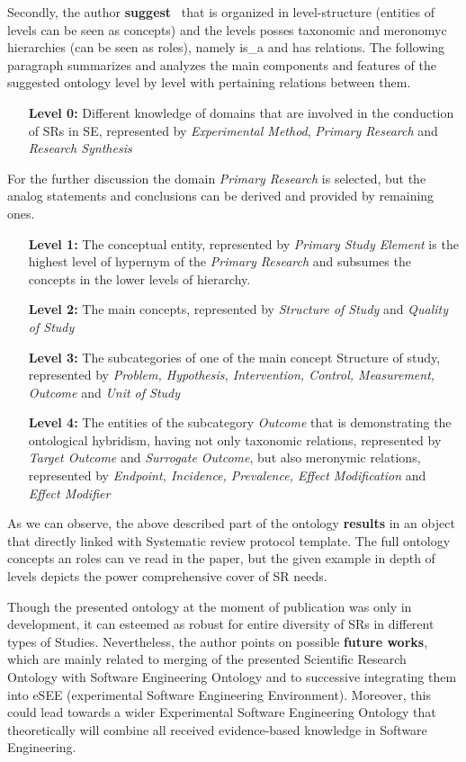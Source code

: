 	Secondly, the author \textbf{suggest} \frqq \ that is organized in level-structure (entities of levels can be seen as concepts) and the levels posses taxonomic and meronomyc hierarchies (can be seen as roles), namely is\_a and has relations. The following paragraph summarizes and analyzes the main components and features of the suggested ontology level by level with pertaining relations between them.
		\begin{itemize}
			\item[\textbf{Level 0:}]  Different knowledge of domains that are involved in the conduction of SRs in SE, represented by \textit{Experimental Method}, \textit{Primary Research} and \textit{Research Synthesis} 
		\end{itemize}
	For the further discussion the domain \textit{Primary Research} is selected, but the analog statements and conclusions can be derived and provided by remaining ones.
		\begin{itemize}
			\item[\textbf{Level 1:}] The conceptual entity, represented by \textit{Primary Study Element} is the highest level of hypernym of the \textit{Primary Research} and subsumes the concepts in the lower levels of hierarchy.
			\item[\textbf{Level 2:}] The main concepts, represented by \textit{Structure of Study} and \textit{Quality of Study} 
			\item[\textbf{Level 3:}] The subcategories of one of the main concept Structure of study, represented by \textit{Problem, Hypothesis, Intervention, Control, Measurement, Outcome} and \textit{Unit of Study}
			\item[\textbf{Level 4:}] The entities of the subcategory \textit{Outcome} that is demonstrating the ontological hybridism, having not only taxonomic relations, represented by \textit{Target Outcome} and \textit{Surrogate Outcome}, but also meronymic relations, represented by \textit{Endpoint, Incidence, Prevalence, Effect Modification} and \textit{Effect Modifier} 
		\end{itemize}
	  As we can observe, the above described part of the ontology \textbf{results} in an object that directly linked with Systematic review protocol template. The full ontology concepts an roles can ve read in the paper, but the given example in depth of levels depicts the power comprehensive cover of SR needs. \newline
	  
	  Though the presented ontology at the moment of publication was only in development, it can esteemed as robust for entire diversity of SRs in different types of Studies. Nevertheless, the  author points on possible \textbf{future works}, which are mainly related to merging of the presented Scientific Research Ontology with Software Engineering Ontology and to successive integrating them into eSEE (experimental Software Engineering Environment). Moreover, this could lead towards a wider Experimental Software Engineering Ontology that theoretically will combine all received evidence-based knowledge in Software Engineering.  
	 
